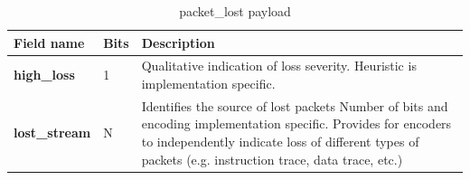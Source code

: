 \begin{table}[!h]
    \centering
    \caption{packet\_lost payload}
    \label{tab:te_support}
    \begin{tabulary}{\textwidth}{|l|p{8mm}|p{80mm}|}
        \hline
        \textbf {Field name} & \textbf {Bits} & \textbf {Description} \\
        \hline
        \textbf{high\_loss} & 1 & Qualitative indication of loss severity.  Heuristic is implementation specific.\\
        \hline
        \textbf{lost\_stream} & N & Identifies the source of lost packets\newline
          Number of bits and encoding implementation specific.  Provides for encoders to independently indicate loss of 
          different types of packets (e.g. instruction trace, data trace, etc.)\\
        \hline
    \end{tabulary}
\end{table}
